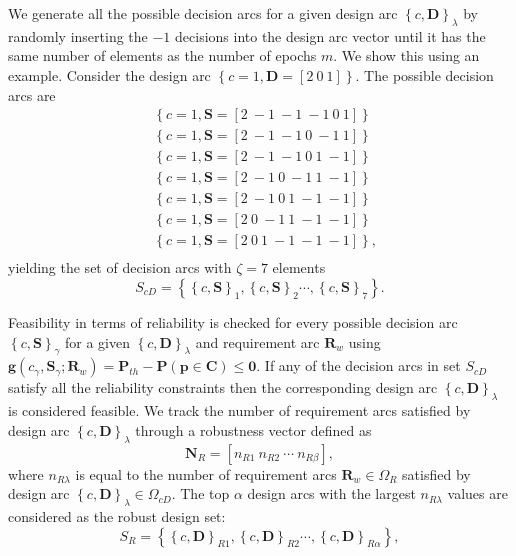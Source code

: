 We generate all the possible decision arcs for a given design arc $\left\{c,\mathbf{D}\right\}_\lambda$ by randomly inserting the $-1$ decisions into the design arc vector until it has the same number of elements as the number of epochs $m$. We show this using an example. Consider the design arc $\left\{c = 1,\mathbf{D} = \left[2 ~ 0 ~ 1\right]\right\}$. The possible decision arcs are
%
\begin{equation*}
	\begin{aligned}
		& \left\{c = 1,\mathbf{S} = \left[2 ~ -1 ~ -1 ~ -1 ~ 0 ~ 1\right]\right\}\\
		& \left\{c = 1,\mathbf{S} = \left[2 ~ -1 ~ -1 ~ 0 ~ -1 ~ 1\right]\right\}\\
		& \left\{c = 1,\mathbf{S} = \left[2 ~ -1 ~ -1 ~ 0 ~ 1 ~ -1\right]\right\}\\
		& \left\{c = 1,\mathbf{S} = \left[2 ~ -1 ~ 0 ~ -1 ~ 1 ~ -1\right]\right\}\\
		& \left\{c = 1,\mathbf{S} = \left[2 ~ -1 ~ 0 ~ 1 ~ -1 ~ -1\right]\right\}\\
		& \left\{c = 1,\mathbf{S} = \left[2 ~ 0 ~ -1 ~ 1 ~ -1 ~ -1\right]\right\}\\
		& \left\{c = 1,\mathbf{S} = \left[2 ~ 0 ~ 1 ~ -1 ~ -1 ~ -1\right]\right\},\\
	\end{aligned}
\end{equation*}
%
yielding the set of decision arcs with $\zeta = 7$ elements
%
\begin{equation} \label{eq:enumeratedcS}
	S_{cD} = \left\{\left\{c,\mathbf{S}\right\}_{1},\left\{c,\mathbf{S}\right\}_{2}\cdots,\left\{c,\mathbf{S}\right\}_{7}\right\}.
\end{equation}

Feasibility in terms of reliability is checked for every possible decision arc $\left\{c,\mathbf{S}\right\}_{\gamma}$ for a given $\left\{c,\mathbf{D}\right\}_\lambda$ and requirement arc $\mathbf{R}_w$ using $\mathbf{g}(c_{\gamma},\mathbf{S}_{\gamma};\mathbf{R}_w) = \mathbf{P}_{th} - \mathbf{P}(\mathbf{p} \in \mathbf{C}) \le \mathbf{0}$. If any of the decision arcs in set $S_{cD}$ satisfy all the reliability constraints then the corresponding design arc $\left\{c,\mathbf{D}\right\}_\lambda$ is considered feasible. We track the number of requirement arcs satisfied by design arc $\left\{c,\mathbf{D}\right\}_\lambda$ through a robustness vector defined as
%
\begin{equation} \label{eq:robustnessvec}
	\mathbf{N}_R = \left[n_{R1} ~ n_{R2} ~ \cdots ~ n_{R\beta}\right], %
\end{equation}
%
where $n_{R\lambda}$ is equal to the number of requirement arcs $\mathbf{R}_w \in \Omega_R$ satisfied by design arc $\left\{c,\mathbf{D}\right\}_\lambda \in \Omega_{cD}$. The top $\alpha$ design arcs with the largest $n_{R\lambda}$ values are considered as the robust design set:
%
\begin{equation} \label{eq:SBDrobust}
	S_R = \left\{\left\{c,\mathbf{D}\right\}_{R1},\left\{c,\mathbf{D}\right\}_{R2}\cdots,\left\{c,\mathbf{D}\right\}_{R\alpha}\right\},
\end{equation}

